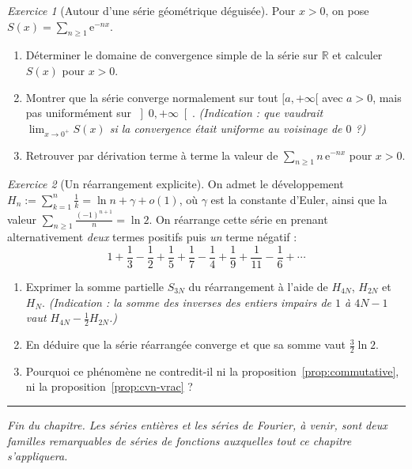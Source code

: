 \documentclass[11pt,a4paper]{article}
\theoremstyle{plain}
\theoremstyle{definition}
\theoremstyle{remark}
\newtheorem{exercice}{Exercice}
\newcommand{\R}{\mathbb{R}}
\numberwithin{equation}{section}
\begin{document}
\begin{exercice}[Autour d'une série géométrique déguisée]
Pour $x>0$, on pose $\displaystyle S(x)=\sum_{n\geq 1}\mathrm{e}^{-nx}$.
\begin{enumerate}
    \item Déterminer le domaine de convergence simple de la série sur
    $\R$ et calculer $S(x)$ pour $x>0$.
    \item Montrer que la série converge normalement sur tout
    $[a,+\infty[$ avec $a>0$, mais pas uniformément sur
    $\left]0,+\infty\right[$. \emph{(Indication : que vaudrait
    $\lim_{x\to 0^+}S(x)$ si la convergence était uniforme au voisinage
    de $0$ ?)}
    \item Retrouver par dérivation terme à terme la valeur de
    $\sum_{n\geq 1} n\,\mathrm{e}^{-nx}$ pour $x>0$.
\end{enumerate}
\end{exercice}

\begin{exercice}[Un réarrangement explicite]\label{exo:rearrangement}
On admet le développement
$H_n:=\sum_{k=1}^{n}\frac{1}{k}=\ln n+\gamma+o(1)$, où $\gamma$ est la
constante d'Euler, ainsi que la valeur
$\sum_{n\geq 1}\frac{(-1)^{n+1}}{n}=\ln 2$. On réarrange cette série en
prenant alternativement \emph{deux} termes positifs puis \emph{un} terme
négatif :
\[
1+\frac{1}{3}-\frac{1}{2}+\frac{1}{5}+\frac{1}{7}-\frac{1}{4}
+\frac{1}{9}+\frac{1}{11}-\frac{1}{6}+\cdots
\]
\begin{enumerate}
    \item Exprimer la somme partielle $S_{3N}$ du réarrangement à l'aide
    de $H_{4N}$, $H_{2N}$ et $H_N$. \emph{(Indication : la somme des
    inverses des entiers impairs de $1$ à $4N-1$ vaut
    $H_{4N}-\frac{1}{2}H_{2N}$.)}
    \item En déduire que la série réarrangée converge et que sa somme vaut
    $\frac{3}{2}\ln 2$.
    \item Pourquoi ce phénomène ne contredit-il ni la
    proposition~\ref{prop:commutative}, ni la
    proposition~\ref{prop:cvn-vrac} ?
\end{enumerate}
\end{exercice}

\vspace{4mm}
\hrule
\vspace{2mm}
\begin{center}
\emph{Fin du chapitre. Les séries entières et les séries de Fourier, à
venir, sont deux familles remarquables de séries de fonctions auxquelles
tout ce chapitre s'appliquera.}
\end{center}
\end{document}
